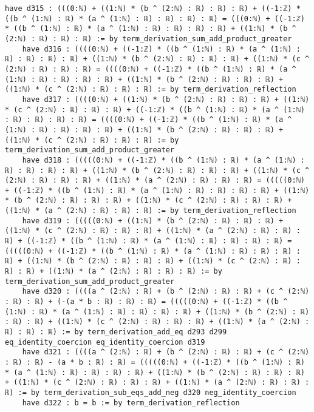 \documentclass{article}
\begin{document}
\begin{tcolorbox}[colback=white!10, width=\linewidth]
\begin{lstlisting}[language=Lean4]
    have d315 : (((0:ℕ) + ((1:ℕ) * (b ^ (2:ℕ) : ℝ) : ℝ) : ℝ) + ((-1:ℤ) * ((b ^ (1:ℕ) : ℝ) * (a ^ (1:ℕ) : ℝ) : ℝ) : ℝ) : ℝ) = (((0:ℕ) + ((-1:ℤ) * ((b ^ (1:ℕ) : ℝ) * (a ^ (1:ℕ) : ℝ) : ℝ) : ℝ) : ℝ) + ((1:ℕ) * (b ^ (2:ℕ) : ℝ) : ℝ) : ℝ) := by term_derivation_sum_add_product_greater
    have d316 : ((((0:ℕ) + ((-1:ℤ) * ((b ^ (1:ℕ) : ℝ) * (a ^ (1:ℕ) : ℝ) : ℝ) : ℝ) : ℝ) + ((1:ℕ) * (b ^ (2:ℕ) : ℝ) : ℝ) : ℝ) + ((1:ℕ) * (c ^ (2:ℕ) : ℝ) : ℝ) : ℝ) = ((((0:ℕ) + ((-1:ℤ) * ((b ^ (1:ℕ) : ℝ) * (a ^ (1:ℕ) : ℝ) : ℝ) : ℝ) : ℝ) + ((1:ℕ) * (b ^ (2:ℕ) : ℝ) : ℝ) : ℝ) + ((1:ℕ) * (c ^ (2:ℕ) : ℝ) : ℝ) : ℝ) := by term_derivation_reflection
    have d317 : ((((0:ℕ) + ((1:ℕ) * (b ^ (2:ℕ) : ℝ) : ℝ) : ℝ) + ((1:ℕ) * (c ^ (2:ℕ) : ℝ) : ℝ) : ℝ) + ((-1:ℤ) * ((b ^ (1:ℕ) : ℝ) * (a ^ (1:ℕ) : ℝ) : ℝ) : ℝ) : ℝ) = ((((0:ℕ) + ((-1:ℤ) * ((b ^ (1:ℕ) : ℝ) * (a ^ (1:ℕ) : ℝ) : ℝ) : ℝ) : ℝ) + ((1:ℕ) * (b ^ (2:ℕ) : ℝ) : ℝ) : ℝ) + ((1:ℕ) * (c ^ (2:ℕ) : ℝ) : ℝ) : ℝ) := by term_derivation_sum_add_product_greater
    have d318 : (((((0:ℕ) + ((-1:ℤ) * ((b ^ (1:ℕ) : ℝ) * (a ^ (1:ℕ) : ℝ) : ℝ) : ℝ) : ℝ) + ((1:ℕ) * (b ^ (2:ℕ) : ℝ) : ℝ) : ℝ) + ((1:ℕ) * (c ^ (2:ℕ) : ℝ) : ℝ) : ℝ) + ((1:ℕ) * (a ^ (2:ℕ) : ℝ) : ℝ) : ℝ) = (((((0:ℕ) + ((-1:ℤ) * ((b ^ (1:ℕ) : ℝ) * (a ^ (1:ℕ) : ℝ) : ℝ) : ℝ) : ℝ) + ((1:ℕ) * (b ^ (2:ℕ) : ℝ) : ℝ) : ℝ) + ((1:ℕ) * (c ^ (2:ℕ) : ℝ) : ℝ) : ℝ) + ((1:ℕ) * (a ^ (2:ℕ) : ℝ) : ℝ) : ℝ) := by term_derivation_reflection
    have d319 : (((((0:ℕ) + ((1:ℕ) * (b ^ (2:ℕ) : ℝ) : ℝ) : ℝ) + ((1:ℕ) * (c ^ (2:ℕ) : ℝ) : ℝ) : ℝ) + ((1:ℕ) * (a ^ (2:ℕ) : ℝ) : ℝ) : ℝ) + ((-1:ℤ) * ((b ^ (1:ℕ) : ℝ) * (a ^ (1:ℕ) : ℝ) : ℝ) : ℝ) : ℝ) = (((((0:ℕ) + ((-1:ℤ) * ((b ^ (1:ℕ) : ℝ) * (a ^ (1:ℕ) : ℝ) : ℝ) : ℝ) : ℝ) + ((1:ℕ) * (b ^ (2:ℕ) : ℝ) : ℝ) : ℝ) + ((1:ℕ) * (c ^ (2:ℕ) : ℝ) : ℝ) : ℝ) + ((1:ℕ) * (a ^ (2:ℕ) : ℝ) : ℝ) : ℝ) := by term_derivation_sum_add_product_greater
    have d320 : ((((a ^ (2:ℕ) : ℝ) + (b ^ (2:ℕ) : ℝ) : ℝ) + (c ^ (2:ℕ) : ℝ) : ℝ) + (-(a * b : ℝ) : ℝ) : ℝ) = (((((0:ℕ) + ((-1:ℤ) * ((b ^ (1:ℕ) : ℝ) * (a ^ (1:ℕ) : ℝ) : ℝ) : ℝ) : ℝ) + ((1:ℕ) * (b ^ (2:ℕ) : ℝ) : ℝ) : ℝ) + ((1:ℕ) * (c ^ (2:ℕ) : ℝ) : ℝ) : ℝ) + ((1:ℕ) * (a ^ (2:ℕ) : ℝ) : ℝ) : ℝ) := by term_derivation_add_eq d293 d299 eq_identity_coercion eq_identity_coercion d319
    have d321 : ((((a ^ (2:ℕ) : ℝ) + (b ^ (2:ℕ) : ℝ) : ℝ) + (c ^ (2:ℕ) : ℝ) : ℝ) - (a * b : ℝ) : ℝ) = (((((0:ℕ) + ((-1:ℤ) * ((b ^ (1:ℕ) : ℝ) * (a ^ (1:ℕ) : ℝ) : ℝ) : ℝ) : ℝ) + ((1:ℕ) * (b ^ (2:ℕ) : ℝ) : ℝ) : ℝ) + ((1:ℕ) * (c ^ (2:ℕ) : ℝ) : ℝ) : ℝ) + ((1:ℕ) * (a ^ (2:ℕ) : ℝ) : ℝ) : ℝ) := by term_derivation_sub_eqs_add_neg d320 neg_identity_coercion
    have d322 : b = b := by term_derivation_reflection

\end{lstlisting}
\end{tcolorbox}
\end{document}
